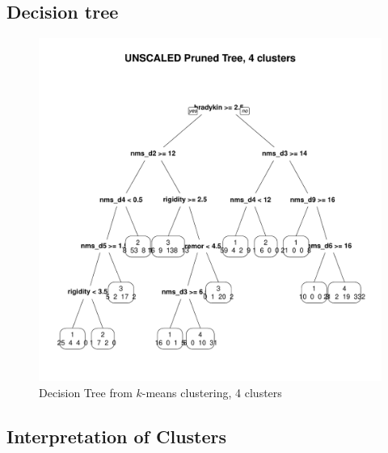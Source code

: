 \documentclass[letterpaper,12pt]{article}
\begin{document}
\subsection{Decision tree}

\begin{figure}[h]
  \centering
  \includegraphics[width=\linewidth]{dtree-kmeans-pruned-unscaled-4.pdf}
  \caption{Decision Tree from $k$-means clustering, 4 clusters}
  \label{fig:kmeans-dtree-4}
\end{figure}

\subsection{Interpretation of Clusters}
\end{document}
